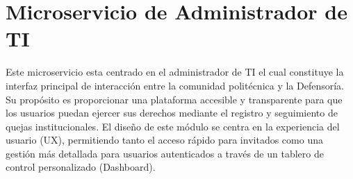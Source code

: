 
\section{Microservicio de Administrador de TI}
\label{sec:modulo_admin_ti}

Este microservicio esta centrado en el administrador de TI el cual constituye la interfaz principal de interacción entre la comunidad politécnica y la Defensoría. 
Su propósito es proporcionar una plataforma accesible y transparente para que los usuarios puedan ejercer sus derechos mediante el registro y seguimiento de quejas institucionales. El diseño de este módulo se centra en la experiencia del usuario (UX), permitiendo tanto el acceso rápido para invitados como una gestión más detallada para usuarios autenticados a través de un tablero de control personalizado (Dashboard).


%
%
%
%